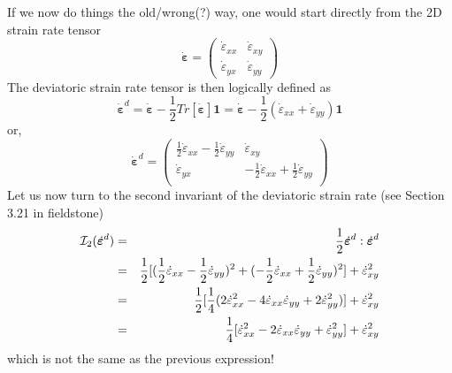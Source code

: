 {\color{darkgray}
If we now do things the old/wrong(?) way, one would start directly from the 2D strain rate tensor 
\[
\dot{\bm \varepsilon} = 
\left(
\begin{array}{cc}
\dot{\varepsilon}_{xx} & \dot{\varepsilon}_{xy}  \\
\dot{\varepsilon}_{yx} & \dot{\varepsilon}_{yy}  
\end{array}
\right)
\]
The deviatoric strain rate tensor is then logically defined as 
\[
\dot{\bm \varepsilon}^d 
= \dot{\bm \varepsilon} -\frac{1}{2} Tr[\dot{\bm \varepsilon}]   {\bm 1} 
= \dot{\bm \varepsilon} -\frac{1}{2} (\dot{\varepsilon}_{xx} +\dot{\varepsilon}_{yy}   )  {\bm 1} 
\]
or,
\[
\dot{\bm \varepsilon}^d = 
\left(
\begin{array}{cc}
\frac{1}{2}\dot{\varepsilon}_{xx} -\frac{1}{2}\dot{\varepsilon}_{yy} & \dot{\varepsilon}_{xy}  \\
\dot{\varepsilon}_{yx} & -\frac{1}{2}\dot{\varepsilon}_{xx} +\frac{1}{2} \dot{\varepsilon}_{yy}  \\
\end{array}
\right)
\]
Let us now turn to the second invariant of the deviatoric strain rate 
(see Section 3.21 in fieldstone)
\begin{eqnarray}
{\cal I}_2(\dot{\bm{\varepsilon}}^d)
&=& \frac{1}{2} \dot{\bm{\varepsilon}}^d:\dot{\bm{\varepsilon}}^d \nonumber\\
&=& \frac{1}{2}[ (\frac{1}{2}\dot{\varepsilon}_{xx} -\frac{1}{2}\dot{\varepsilon}_{yy})^2 + (-\frac{1}{2}\dot{\varepsilon}_{xx} +\frac{1}{2} \dot{\varepsilon}_{yy})^2  ] + \dot{\varepsilon}_{xy}^2 \nonumber\\
&=& \frac12 [ \frac14 (2\dot{\varepsilon}_{xx}^2  -4 \dot{\varepsilon}_{xx}\dot{\varepsilon}_{yy} +2\dot{\varepsilon}_{yy}^2 )  ] + \dot{\varepsilon}_{xy}^2 \nonumber\\
&=& \frac14 [ \dot{\varepsilon}_{xx}^2  -2 \dot{\varepsilon}_{xx}\dot{\varepsilon}_{yy} +\dot{\varepsilon}_{yy}^2   ] + \dot{\varepsilon}_{xy}^2 
\end{eqnarray}
which is not the same as the previous expression! 
}



